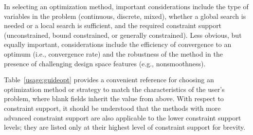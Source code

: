 In selecting an optimization method, important considerations include
the type of variables in the problem (continuous, discrete, mixed),
whether a global search is needed or a local search is sufficient, and
the required constraint support (unconstrained, bound constrained,
or generally constrained). Less obvious, but equally important,
considerations include the efficiency of convergence to an optimum
(i.e., convergence rate) and the robustness of the method in the
presence of challenging design space features (e.g., nonsmoothness).

Table~\ref{usage:guideopt} provides a convenient reference for
choosing an optimization method or strategy to match the
characteristics of the user's problem, where blank fields inherit the
value from above. With respect to constraint support, it should be
understood that the methods with more advanced constraint support are
also applicable to the lower constraint support levels; they are
listed only at their highest level of constraint support for brevity.

